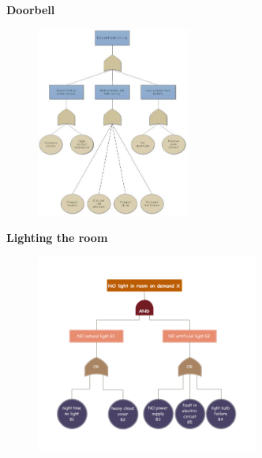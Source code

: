\documentclass[aspectratio=1610,pdftex,dvipsnames,compress,xcolor={dvipsnames}]{beamer}
\begin{document}
\begin{frame}[plain]{}
    \centering\LARGE\textbf{Doorbell}
\end{frame}


\addtocounter{framenumber}{-1}
\begin{frame}{}
    \begin{figure}
        \centering
        \includegraphics[width=0.45\textwidth]{fault.tree_doorbell.jpg}
    \end{figure}
\end{frame}


\begin{frame}[plain]{}
    \centering\LARGE\textbf{Lighting the room}
\end{frame}


\addtocounter{framenumber}{-1}
\begin{frame}{}
    \begin{figure}
        \centering
        \includegraphics[width=0.65\textwidth]{fault.tree_room.jpg}
    \end{figure}
\end{frame}
\end{document}
